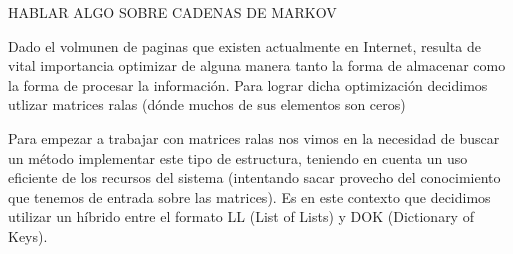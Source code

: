 
\par HABLAR ALGO SOBRE CADENAS DE MARKOV

\par Dado el volmunen de paginas que existen actualmente en Internet, resulta de vital importancia 
optimizar de alguna manera tanto la forma de almacenar
como la forma de procesar la informaci\'on. Para lograr dicha optimizaci\'on decidimos utlizar matrices ralas
 (d\'onde muchos de sus elementos son ceros)
\par Para empezar a trabajar con matrices ralas nos vimos en la necesidad de buscar un método implementar
 este tipo de estructura, teniendo en cuenta un uso eficiente de los recursos del sistema 
 (intentando sacar provecho del conocimiento que tenemos de entrada sobre las matrices). 
Es en este contexto que decidimos utilizar un h\'ibrido entre el formato LL (List of Lists) y 
DOK (Dictionary of Keys).\newline
